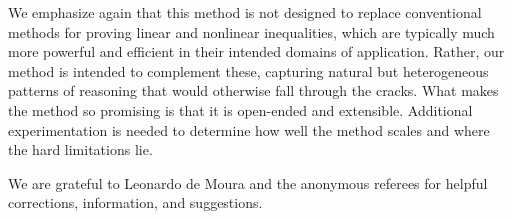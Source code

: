 \documentclass[runningheds]{llncs}
\begin{document}
We emphasize again that this method is not designed to replace conventional methods for proving linear and nonlinear inequalities, which are typically much more powerful and efficient in their intended domains of application. Rather, our method is intended to complement these, capturing natural but heterogeneous patterns of reasoning that would otherwise fall through the cracks. What makes the method so promising is that it is open-ended and extensible. Additional experimentation is needed to determine how well the method scales and where the hard limitations lie. 

\medskip

 We are grateful to Leonardo de Moura and the anonymous referees for helpful corrections, information, and suggestions.
\end{document}

